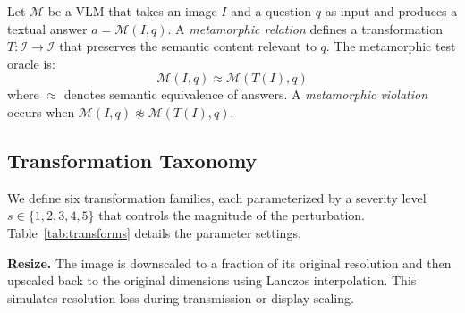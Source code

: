 \documentclass[10pt,twocolumn,letterpaper]{article}
\begin{document}
Let $\mathcal{M}$ be a VLM that takes an image $I$ and a question $q$ as input and produces a textual answer $a = \mathcal{M}(I, q)$. A \emph{metamorphic relation} defines a transformation $T: \mathcal{I} \to \mathcal{I}$ that preserves the semantic content relevant to $q$. The metamorphic test oracle is:
\begin{equation}
    \mathcal{M}(I, q) \approx \mathcal{M}(T(I), q)
\end{equation}
where $\approx$ denotes semantic equivalence of answers. A \emph{metamorphic violation} occurs when $\mathcal{M}(I, q) \not\approx \mathcal{M}(T(I), q)$.

\subsection{Transformation Taxonomy}

We define six transformation families, each parameterized by a severity level $s \in \{1, 2, 3, 4, 5\}$ that controls the magnitude of the perturbation. Table~\ref{tab:transforms} details the parameter settings.

\begin{table}[t]
\centering
\caption{Transformation families and severity-level parameters. All transformations are semantic-preserving by design.}
\label{tab:transforms}
\end{table}

\textbf{Resize.} The image is downscaled to a fraction of its original resolution and then upscaled back to the original dimensions using Lanczos interpolation. This simulates resolution loss during transmission or display scaling.
\end{document}
